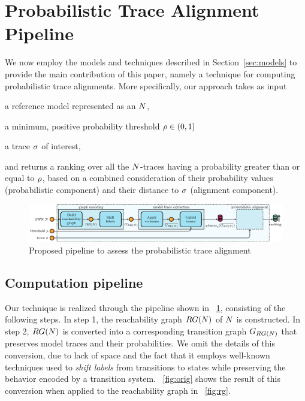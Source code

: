 

\section{Probabilistic Trace Alignment Pipeline}
We now employ the models and techniques described in Section~\ref{sec:models} to provide the main contribution of this paper, namely a technique for computing probabilistic trace alignments. More specifically, our approach takes as input
\begin{inparaenum}[\it (i)]
\item a reference model represented as an \uswn $N$,
\item a minimum, positive probability threshold $\rho \in (0,1]$
\item a trace $\sigma$ of interest,
\end{inparaenum}
and returns a ranking over all the $N$-traces having a probability greater than or equal to $\rho$, based on a combined consideration of their probability values (probabilistic component) and their distance to $\sigma$ (alignment component).

\begin{figure}[!t]
	\hspace*{-1cm}\includegraphics[width=1.2\textwidth]{images/pipeline}
	\caption{Proposed pipeline to assess the probabilistic trace alignment}\label{fig:pipe}
\end{figure}


\subsection{Computation pipeline}
Our technique is realized through the pipeline shown in \figurename~\ref{fig:pipe}, consisting of the following steps.
%
In step 1, the reachability graph $RG(N)$ of $N$ is constructed.
%
In step 2,  $RG(N)$ is converted into a corresponding transition graph $G_{RG(N)}$ that preserves model traces and their probabilities. We omit the details of this conversion, due to lack of space and the fact that it employs well-known techniques used to \emph{shift labels} from transitions to states while preserving the behavior encoded by a transition system. \figurename~\ref{fig:orig} shows the result of this conversion when applied to the reachability graph in \figurename~\ref{fig:rg}.


